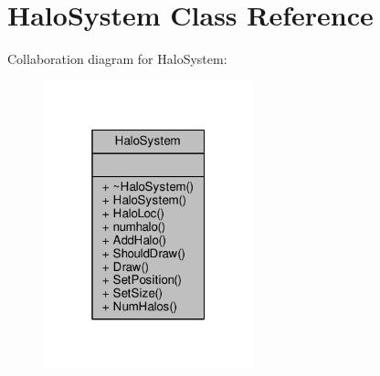 \hypertarget{classHaloSystem}{}\section{Halo\+System Class Reference}
\label{classHaloSystem}


Collaboration diagram for Halo\+System\+:
\nopagebreak
\begin{figure}[H]
\begin{center}
\leavevmode
\includegraphics[width=172pt]{d3/df6/classHaloSystem__coll__graph}
\end{center}
\end{figure}
